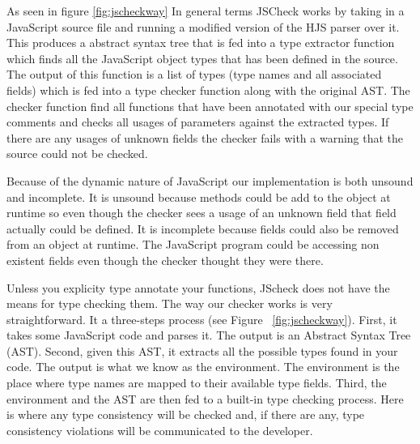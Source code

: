 \documentclass{article}
\begin{document}
As seen in figure \ref{fig:jscheckway} In general terms JSCheck works by taking in a JavaScript source file and running
a modified version of the HJS parser over it. This produces a abstract syntax tree
that is fed into a type extractor function which finds all the JavaScript object types that
has been defined in the source. The output of this function is a list of types (type names and all associated fields)
which is fed into a type checker function along with the original AST. The
checker function find all functions that have been annotated with our special
type comments and checks all usages of parameters against the extracted types. 
If there are any usages of unknown fields the checker fails with a warning that
the source could not be checked.

Because of the dynamic nature of JavaScript our implementation is both unsound 
and incomplete. It is unsound because methods could be add to the object at
runtime so even though the checker sees a usage of an unknown field that field
actually could be defined. It is incomplete because fields could also be removed
from an object at runtime. The JavaScript program could be accessing non existent 
fields even though the checker thought they were there.

Unless you explicity type annotate your functions, JScheck does not have the means 
for type checking them. The way our checker works is very straightforward. It a
three-steps process (see Figure ~\ref{fig:jscheckway}). First, it takes some JavaScript 
code and parses it. The output is an Abstract Syntax Tree (AST). Second, given this AST, 
it extracts all the possible types found in your code. The output is what we know 
as the environment. The environment is the place where type names are mapped to 
their available type fields. Third, the environment and the AST are then fed to 
a built-in type checking process. Here is where any type consistency will be checked 
and, if there are any, type consistency violations will be communicated to the 
developer. 
\end{document}
